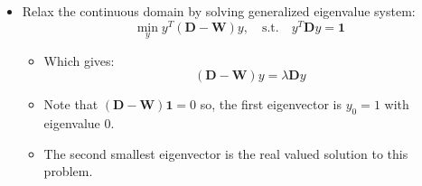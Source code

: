 \documentclass[10pt,mathserif]{beamer}
\begin{document}
\begin{frame}
\begin{itemize}
    \item Relax the continuous domain by solving generalized eigenvalue system:
    \begin{equation*}
         \min_y y^T(\bm{D}-\bm{W})y, \quad \text{s.t.} \quad y^T\bm{D}y = \bm{1}
    \end{equation*}
    \begin{itemize}
        \item Which gives: 
        \begin{equation*}
            (\bm{D}-\bm{W})y = \lambda \bm{D}y
        \end{equation*}
        \item Note that $(\bm{D}-\bm{W})\bm{1} = 0$ so, the first eigenvector is $y_0=1$ with eigenvalue $0$.
        \item The second smallest eigenvector is the real valued solution to this problem.
    \end{itemize}
\end{itemize}
    
\end{frame}
\end{document}
